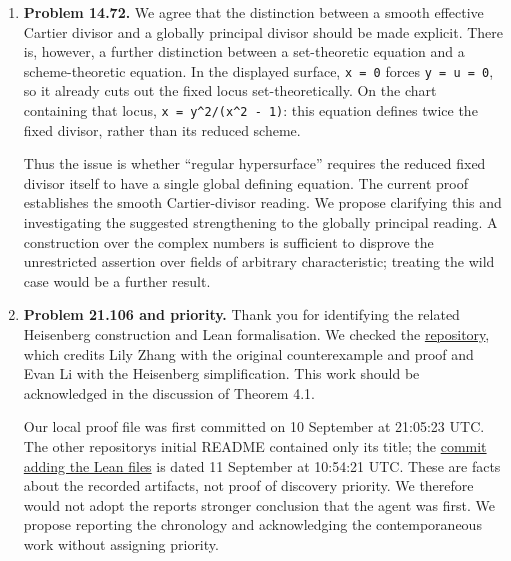 \begin{enumerate}
  We will also check the field restrictions when clarifying part (b).
  The suggestion that the identical class works over any field needs
  qualification: in characteristic two, for example, the argument that
  its square omits \nolinkurl{-I} no longer applies.
\item
  \textbf{Problem 14.72.} We agree that the distinction between a smooth
  effective Cartier divisor and a globally principal divisor should be
  made explicit. There is, however, a further distinction between a
  set-theoretic equation and a scheme-theoretic equation. In the
  displayed surface, \nolinkurl{x = 0} forces \nolinkurl{y = u = 0}, so
  it already cuts out the fixed locus set-theoretically. On the chart
  containing that locus, \nolinkurl{x = y^2/(x^2 - 1)}: this equation
  defines twice the fixed divisor, rather than its reduced scheme.

  Thus the issue is whether ``regular hypersurface'' requires the
  reduced fixed divisor itself to have a single global defining
  equation. The current proof establishes the smooth Cartier-divisor
  reading. We propose clarifying this and investigating the suggested
  strengthening to the globally principal reading. A construction over
  the complex numbers is sufficient to disprove the unrestricted
  assertion over fields of arbitrary characteristic; treating the wild
  case would be a further result.
\item
  \textbf{Problem 21.106 and priority.} Thank you for identifying the
  related Heisenberg construction and Lean formalisation. We checked the
  \href{https://github.com/TPColor/kourovka-notebook-problem-21.106}{repository},
  which credits Lily Zhang with the original counterexample and proof
  and Evan Li with the Heisenberg simplification. This work should be
  acknowledged in the discussion of Theorem 4.1.

  Our local proof file was first committed on 10 September at 21:05:23
  UTC. The other repository\textquotesingle s initial README contained
  only its title; the
  \href{https://github.com/TPColor/kourovka-notebook-problem-21.106/commit/f32b72719e07}{commit
  adding the Lean files} is dated 11 September at 10:54:21 UTC. These
  are facts about the recorded artifacts, not proof of discovery
  priority. We therefore would not adopt the report\textquotesingle s
  stronger conclusion that the agent was first. We propose reporting the
  chronology and acknowledging the contemporaneous work without
  assigning priority.


\end{enumerate}
